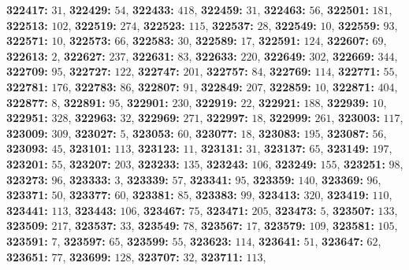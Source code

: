 \textsf{\bfseries 322417:} $31$, \textsf{\bfseries 322429:} $54$, \textsf{\bfseries 322433:} $418$, \textsf{\bfseries 322459:} $31$, \textsf{\bfseries 322463:} $56$, \textsf{\bfseries 322501:} $181$, \textsf{\bfseries 322513:} $102$, \textsf{\bfseries 322519:} $274$, \textsf{\bfseries 322523:} $115$, \textsf{\bfseries 322537:} $28$, \textsf{\bfseries 322549:} $10$, \textsf{\bfseries 322559:} $93$, \textsf{\bfseries 322571:} $10$, \textsf{\bfseries 322573:} $66$, \textsf{\bfseries 322583:} $30$, \textsf{\bfseries 322589:} $17$, \textsf{\bfseries 322591:} $124$, \textsf{\bfseries 322607:} $69$, \textsf{\bfseries 322613:} $2$, \textsf{\bfseries 322627:} $237$, \textsf{\bfseries 322631:} $83$, \textsf{\bfseries 322633:} $220$, \textsf{\bfseries 322649:} $302$, \textsf{\bfseries 322669:} $344$, \textsf{\bfseries 322709:} $95$, \textsf{\bfseries 322727:} $122$, \textsf{\bfseries 322747:} $201$, \textsf{\bfseries 322757:} $84$, \textsf{\bfseries 322769:} $114$, \textsf{\bfseries 322771:} $55$, \textsf{\bfseries 322781:} $176$, \textsf{\bfseries 322783:} $86$, \textsf{\bfseries 322807:} $91$, \textsf{\bfseries 322849:} $207$, \textsf{\bfseries 322859:} $10$, \textsf{\bfseries 322871:} $404$, \textsf{\bfseries 322877:} $8$, \textsf{\bfseries 322891:} $95$, \textsf{\bfseries 322901:} $230$, \textsf{\bfseries 322919:} $22$, \textsf{\bfseries 322921:} $188$, \textsf{\bfseries 322939:} $10$, \textsf{\bfseries 322951:} $328$, \textsf{\bfseries 322963:} $32$, \textsf{\bfseries 322969:} $271$, \textsf{\bfseries 322997:} $18$, \textsf{\bfseries 322999:} $261$, \textsf{\bfseries 323003:} $117$, \textsf{\bfseries 323009:} $309$, \textsf{\bfseries 323027:} $5$, \textsf{\bfseries 323053:} $60$, \textsf{\bfseries 323077:} $18$, \textsf{\bfseries 323083:} $195$, \textsf{\bfseries 323087:} $56$, \textsf{\bfseries 323093:} $45$, \textsf{\bfseries 323101:} $113$, \textsf{\bfseries 323123:} $11$, \textsf{\bfseries 323131:} $31$, \textsf{\bfseries 323137:} $65$, \textsf{\bfseries 323149:} $197$, \textsf{\bfseries 323201:} $55$, \textsf{\bfseries 323207:} $203$, \textsf{\bfseries 323233:} $135$, \textsf{\bfseries 323243:} $106$, \textsf{\bfseries 323249:} $155$, \textsf{\bfseries 323251:} $98$, \textsf{\bfseries 323273:} $96$, \textsf{\bfseries 323333:} $3$, \textsf{\bfseries 323339:} $57$, \textsf{\bfseries 323341:} $95$, \textsf{\bfseries 323359:} $140$, \textsf{\bfseries 323369:} $96$, \textsf{\bfseries 323371:} $50$, \textsf{\bfseries 323377:} $60$, \textsf{\bfseries 323381:} $85$, \textsf{\bfseries 323383:} $99$, \textsf{\bfseries 323413:} $320$, \textsf{\bfseries 323419:} $110$, \textsf{\bfseries 323441:} $113$, \textsf{\bfseries 323443:} $106$, \textsf{\bfseries 323467:} $75$, \textsf{\bfseries 323471:} $205$, \textsf{\bfseries 323473:} $5$, \textsf{\bfseries 323507:} $133$, \textsf{\bfseries 323509:} $217$, \textsf{\bfseries 323537:} $33$, \textsf{\bfseries 323549:} $78$, \textsf{\bfseries 323567:} $17$, \textsf{\bfseries 323579:} $109$, \textsf{\bfseries 323581:} $105$, \textsf{\bfseries 323591:} $7$, \textsf{\bfseries 323597:} $65$, \textsf{\bfseries 323599:} $55$, \textsf{\bfseries 323623:} $114$, \textsf{\bfseries 323641:} $51$, \textsf{\bfseries 323647:} $62$, \textsf{\bfseries 323651:} $77$, \textsf{\bfseries 323699:} $128$, \textsf{\bfseries 323707:} $32$, \textsf{\bfseries 323711:} $113$, 
